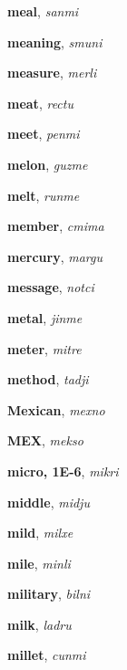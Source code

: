 \documentclass[12pt]{book}
\begin{document}
\begin{description}
\item[ ] \textbf{meal}, \textit{sanmi}

\item[ ] \textbf{meaning}, \textit{smuni}

\item[ ] \textbf{measure}, \textit{merli}

\item[ ] \textbf{meat}, \textit{rectu}

\item[ ] \textbf{meet}, \textit{penmi}

\item[ ] \textbf{melon}, \textit{guzme}

\item[ ] \textbf{melt}, \textit{runme}

\item[ ] \textbf{member}, \textit{cmima}

\item[ ] \textbf{mercury}, \textit{margu}

\item[ ] \textbf{message}, \textit{notci}

\item[ ] \textbf{metal}, \textit{jinme}

\item[ ] \textbf{meter}, \textit{mitre}

\item[ ] \textbf{method}, \textit{tadji}

\item[ ] \textbf{Mexican}, \textit{mexno}

\item[ ] \textbf{MEX}, \textit{mekso}

\item[ ] \textbf{micro, 1E-6}, \textit{mikri}

\item[ ] \textbf{middle}, \textit{midju}

\item[ ] \textbf{mild}, \textit{milxe}

\item[ ] \textbf{mile}, \textit{minli}

\item[ ] \textbf{military}, \textit{bilni}

\item[ ] \textbf{milk}, \textit{ladru}

\item[ ] \textbf{millet}, \textit{cunmi}


\end{description}
\end{document}
